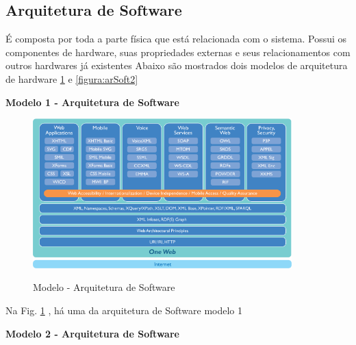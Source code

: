                 
                
                  \subsection{Arquitetura de Software}
  
 
É composta por toda a parte física que está relacionada com o sistema. Possui os componentes de hardware, suas propriedades externas e seus relacionamentos com outros hardwares já existentes
Abaixo são mostrados dois modelos de arquitetura de hardware   \ref{figura:arsoft} e \ref{figura:arSoft2}
  
   \textbf{Modelo 1 - Arquitetura de Software }
  
       \begin{figure}[H]
                 \caption{Modelo - Arquitetura de Software}
               \centering %
                \includegraphics[width=10cm]{analisedeProjeto/arsoft} %
                \label{figura:arsoft}
                \end{figure}
                Na Fig. \ref{figura:arsoft} , há uma da arquitetura de Software modelo 1
                
                
                     \textbf{Modelo 2 - Arquitetura de Software }  
                
